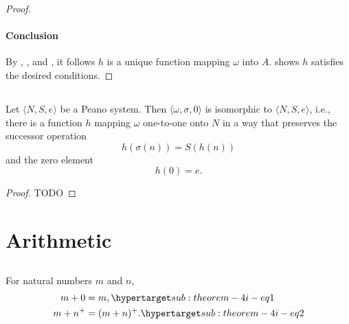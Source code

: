 \documentclass{report}
\begin{document}
\begin{proof}
  \paragraph{Conclusion}%

    By ,
      , and
      , it follows $h$ is a
      unique function mapping $\omega$ into $A$.
     shows $h$ satisfies the
      desired conditions.

\end{proof}

\subsection{}%

\begin{theorem}[4H]

  Let $\langle N, S, e \rangle$ be a Peano system.
  Then $\langle \omega, \sigma, 0 \rangle$ is isomorphic to
    $\langle N, S, e \rangle$, i.e., there is a function $h$ mapping $\omega$
    one-to-one onto $N$ in a way that preserves the successor operation
    $$h(\sigma(n)) = S(h(n))$$ and the zero element $$h(0) = e.$$

\end{theorem}

\begin{proof}

  TODO

\end{proof}

\section{Arithmetic}%

\subsection{}

\begin{theorem}[4I]

  For natural numbers $m$ and $n$,
    \begin{align}
      m + 0 & = m, \hyperlabel{sub:theorem-4i-eq1} \\
      m + n^+ & = (m + n)^+. \hyperlabel{sub:theorem-4i-eq2}
    \end{align}

\end{theorem}
\end{document}
